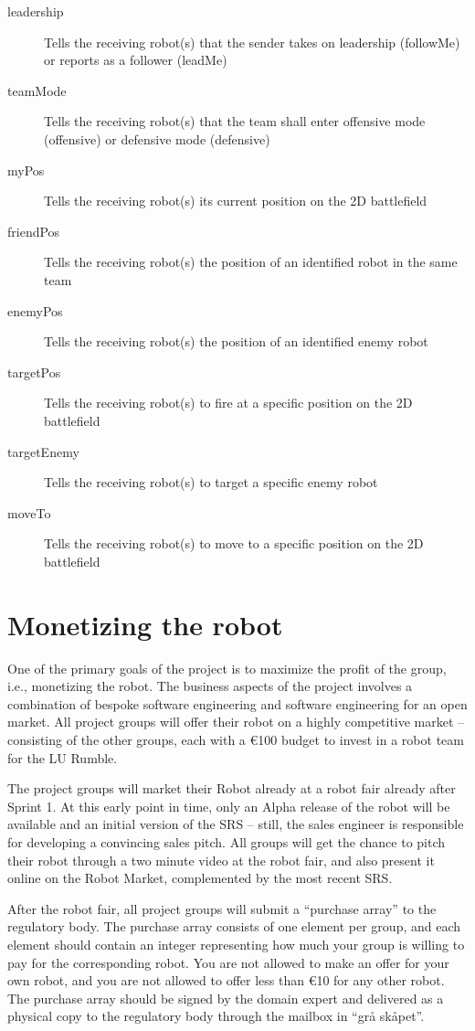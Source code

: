 \documentclass{scrreprt}
\begin{document}
\begin{description}
\item[leadership] Tells the receiving robot(s) that the sender takes on leadership (followMe) or reports as a follower (leadMe)
\item[teamMode] Tells the receiving robot(s) that the team shall enter offensive mode (offensive) or defensive mode (defensive)
\item[myPos] Tells the receiving robot(s) its current position on the 2D battlefield
\item[friendPos] Tells the receiving robot(s) the position of an identified robot in the same team
\item[enemyPos] Tells the receiving robot(s) the position of an identified enemy robot
\item[targetPos] Tells the receiving robot(s) to fire at a specific position on the 2D battlefield
\item[targetEnemy] Tells the receiving robot(s) to target a specific enemy robot
\item[moveTo] Tells the receiving robot(s) to move to a specific position on the 2D battlefield
\end{description}

\section{Monetizing the robot}
One of the primary goals of the project is to maximize the profit of the group, i.e., monetizing the robot. The business aspects of the project involves a combination of bespoke software engineering and software engineering for an open market. All project groups will offer their robot on a highly competitive market -- consisting of the other groups, each with a \euro 100 budget to invest in a robot team for the LU Rumble.

The project groups will market their Robot already at a robot fair already after Sprint 1. At this early point in time, only an Alpha release of the robot will be available and an initial version of the SRS -- still, the sales engineer is responsible for developing a convincing sales pitch. All groups will get the chance to pitch their robot through a two minute video at the robot fair, and also present it online on the Robot Market, complemented by the most recent SRS.

After the robot fair, all project groups will submit a ``purchase array'' to the regulatory body. The purchase array consists of one element per group, and each element should contain an integer representing how much your group is willing to pay for the corresponding robot. You are not allowed to make an offer for your own robot, and you are not allowed to offer less than \euro 10 for any other robot. The purchase array should be signed by the domain expert and delivered as a physical copy to the regulatory body through the mailbox in ``grå skåpet''.
\end{document}
